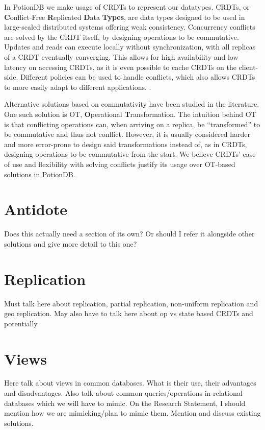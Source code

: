 In PotionDB we make usage of CRDTs to represent our datatypes.
CRDTs, or \textbf{C}onflict-Free  \textbf{R}eplicated \textbf{D}ata \textbf{Types}, are data types designed to be used in large-scaled distributed systems offering weak consistency.
Concurrency conflicts are solved by the CRDT itself, by designing operations to be commutative.
Updates and reads can execute locally without synchronization, with all replicas of a CRDT eventually converging.
This allows for high availability and low latency on accessing CRDTs, as it is even possible to cache CRDTs on the client-side.
Different policies can be used to handle conflicts, which also allows CRDTs to more easily adapt to different applications.
.

Alternative solutions based on commutativity have been studied in the literature. 
One such solution is OT, \textbf{O}perational \textbf{T}ransformation.
The intuition behind OT is that conflicting operations can, when arriving on a replica, be ``transformed'' to be commutative and thus not conflict.
However, it is usually considered harder and more error-prone to design said transformations instead of, as in CRDTs, designing operations to be commutative from the start.
We believe CRDTs' ease of use and flexibility with solving conflicts justify its usage over OT-based solutions in PotionDB.

\section{Antidote}

Does this actually need a section of its own? Or should I refer it alongside other solutions and give more detail to this one?

\section{Replication}

Must talk here about replication, partial replication, non-uniform replication and geo replication. May also have to talk here about op vs state based CRDTs and potentially.

\section{Views}

Here talk about views in common databases. What is their use, their advantages and disadvantages. Also talk about common queries/operations in relational databases which we will have to mimic. On the Research Statement, I should mention how we are mimicking/plan to mimic them.
Mention and discuss existing solutions.

